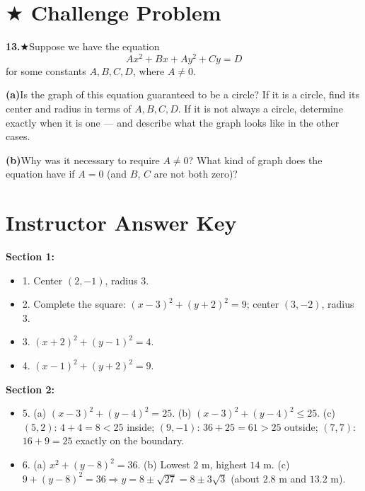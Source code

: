 \documentclass[12pt]{article}
\begin{document}
\vspace{4.5cm}

\newpage
\section*{$\bigstar$ Challenge Problem}

\textbf{13.}\quad$\bigstar$\quad Suppose we have the equation
\[
  Ax^2 + Bx + Ay^2 + Cy = D
\]
for some constants $A, B, C, D$, where $A \neq 0$.

\medskip
\textbf{(a)}\quad Is the graph of this equation guaranteed to be a circle? If it is a circle, find its center and radius in terms of $A, B, C, D$. If it is not always a circle, determine exactly when it is one --- and describe what the graph looks like in the other cases.

\vspace{9cm}
\textbf{(b)}\quad Why was it necessary to require $A \neq 0$? What kind of graph does the equation have if $A = 0$ (and $B$, $C$ are not both zero)?

\vspace{4cm}

\newpage
\section*{Instructor Answer Key}

\textbf{Section 1:}
\begin{itemize}\itemsep2pt
  \item 1. Center $(2,-1)$, radius $3$.
  \item 2. Complete the square: $(x-3)^2 + (y+2)^2 = 9$; center $(3,-2)$, radius $3$.
  \item 3. $(x+2)^2 + (y-1)^2 = 4$.
  \item 4. $(x-1)^2 + (y+2)^2 = 9$.
\end{itemize}

\textbf{Section 2:}
\begin{itemize}\itemsep2pt
  \item 5. (a) $(x-3)^2+(y-4)^2=25$. (b) $(x-3)^2+(y-4)^2 \le 25$. (c) $(5,2)$: $4+4=8<25$ inside; $(9,-1)$: $36+25=61>25$ outside; $(7,7)$: $16+9=25$ exactly on the boundary.
  \item 6. (a) $x^2+(y-8)^2=36$. (b) Lowest $2$ m, highest $14$ m. (c) $9+(y-8)^2=36 \Rightarrow y = 8 \pm \sqrt{27} = 8 \pm 3\sqrt3$ (about $2.8$ m and $13.2$ m).
\end{itemize}
\end{document}
